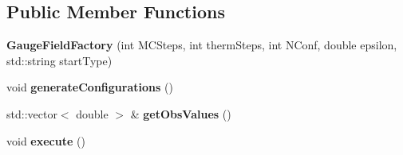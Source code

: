 \subsection*{Public Member Functions}
\begin{DoxyCompactItemize}
\item 
{\bfseries Gauge\+Field\+Factory} (int M\+C\+Steps, int therm\+Steps, int N\+Conf, double epsilon, std\+::string start\+Type)\hypertarget{classGaugeFieldFactory_ab4de95086757f8dad2bb82225990798c}{}\label{classGaugeFieldFactory_ab4de95086757f8dad2bb82225990798c}

\item 
void {\bfseries generate\+Configurations} ()\hypertarget{classGaugeFieldFactory_a44af20883686c17d5cc02b0017981a00}{}\label{classGaugeFieldFactory_a44af20883686c17d5cc02b0017981a00}

\item 
std\+::vector$<$ double $>$ \& {\bfseries get\+Obs\+Values} ()\hypertarget{classGaugeFieldFactory_a3455c32bf0d8e97c5b20a6372b108a42}{}\label{classGaugeFieldFactory_a3455c32bf0d8e97c5b20a6372b108a42}

\item 
void {\bfseries execute} ()\hypertarget{classGaugeFieldFactory_ae71b983ead390226ddad5d0f13aba0c6}{}\label{classGaugeFieldFactory_ae71b983ead390226ddad5d0f13aba0c6}

\end{DoxyCompactItemize}
